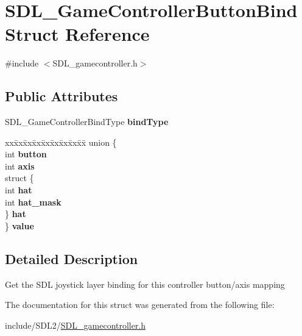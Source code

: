 \hypertarget{struct_s_d_l___game_controller_button_bind}{}\section{S\+D\+L\+\_\+\+Game\+Controller\+Button\+Bind Struct Reference}
\label{struct_s_d_l___game_controller_button_bind}


{\ttfamily \#include $<$S\+D\+L\+\_\+gamecontroller.\+h$>$}

\subsection*{Public Attributes}
\begin{DoxyCompactItemize}
\item 
\mbox{\label{struct_s_d_l___game_controller_button_bind_a032fd941b0e8e5e2cdf52b7597f559b9}} 
S\+D\+L\+\_\+\+Game\+Controller\+Bind\+Type {\bfseries bind\+Type}
\item 
\mbox{\label{struct_s_d_l___game_controller_button_bind_a617787596bd34e89e7619a585cab0c94}} 
\begin{tabbing}
xx\=xx\=xx\=xx\=xx\=xx\=xx\=xx\=xx\=\kill
union \{\\
\>int {\bfseries button}\\
\>int {\bfseries axis}\\
\>struct \{\\
\>\>int {\bfseries hat}\\
\>\>int {\bfseries hat\_mask}\\
\>\} {\bfseries hat}\\
\} {\bfseries value}\\

\end{tabbing}\end{DoxyCompactItemize}


\subsection{Detailed Description}
Get the S\+DL joystick layer binding for this controller button/axis mapping 

The documentation for this struct was generated from the following file\+:\begin{DoxyCompactItemize}
\item 
include/\+S\+D\+L2/\hyperlink{_s_d_l__gamecontroller_8h}{S\+D\+L\+\_\+gamecontroller.\+h}\end{DoxyCompactItemize}
